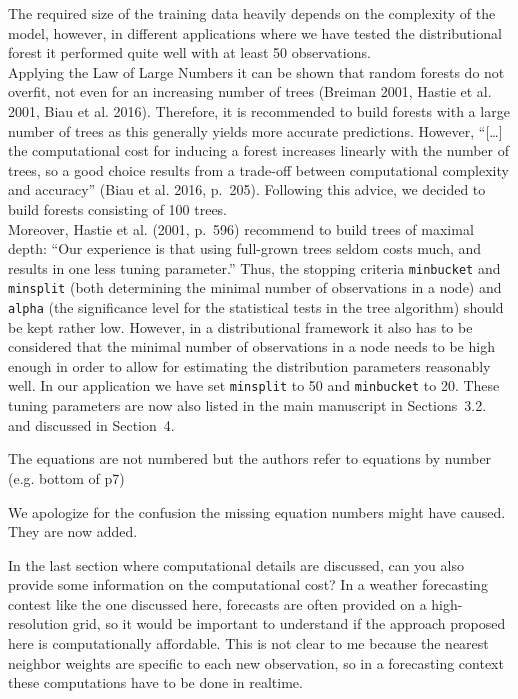 \documentclass[american,foldmarks=false,noconfig]{uibklttr}
\newenvironment{review}{\fontshape{\itdefault}\fontseries{\bfdefault} \selectfont \smallskip}{\par}
\begin{document}
The required size of the training data heavily depends on the complexity 
of the model, however, in different applications where we have tested the 
distributional forest it performed quite well with at least 50 observations. \\
Applying the Law of Large Numbers it can be shown that random forests do not overfit, 
not even for an increasing number of trees (Breiman 2001, Hastie et al. 2001, 
Biau et al. 2016). Therefore, it is recommended to build forests with a large number 
of trees as this generally yields more accurate predictions. 
However, ``[\dots] the computational cost for inducing a forest increases linearly 
with the number of trees, so a good choice results from a trade-off between 
computational complexity and accuracy'' (Biau et al. 2016, p.~205). Following this 
advice, we decided to build forests consisting of 100 trees.\\
Moreover, Hastie et al. (2001, p.~596) recommend to build trees of maximal depth:
``Our experience is that using full-grown trees seldom costs much, and 
results in one less tuning parameter.''
Thus, the stopping criteria \texttt{minbucket} and \texttt{minsplit} (both 
determining the minimal number of observations in a node) and \texttt{alpha} 
(the significance level for the statistical tests in the tree algorithm) should 
be kept rather low. However, in a distributional framework it also has to be 
considered that the minimal number of observations in a node needs to be high 
enough in order to allow for estimating the distribution parameters reasonably well.
In our application we have set \texttt{minsplit} to 50 and \texttt{minbucket} to 20.
These tuning parameters are now also listed in the main manuscript in Sections~3.2.
and discussed in Section~4.


\begin{review}
The equations are not numbered but the authors refer to equations 
by number (e.g. bottom of p7)
\end{review}

We apologize for the confusion the missing equation numbers 
might have caused. They are now added.

\begin{review}
In the last section where computational details are discussed, 
can you also provide some information on the computational cost? 
In a weather forecasting contest like the one discussed here, 
forecasts are often provided on a high-resolution grid, 
so it would be important to understand if the approach 
proposed here is computationally affordable. This is not clear 
to me because the nearest neighbor weights are specific 
to each new observation, so in a forecasting context these 
computations have to be done in realtime.
\end{review}
\end{document}
